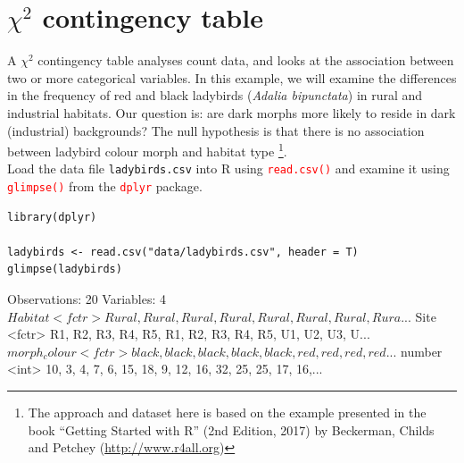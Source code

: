 \documentclass[a4paper,12pt]{article}
\newcommand\code[1]{\textcolor{red}{\texttt{#1}}}
\begin{document}


% 

\section{$\chi^{2}$ contingency table}

A $\chi ^{2}$ contingency table analyses count data, and looks at the association between two or more categorical variables. In this example, we will examine the differences in the frequency of red and black ladybirds (\textit{Adalia bipunctata}) in rural and industrial habitats. Our question is: are dark morphs more likely to reside in dark (industrial) backgrounds? The null hypothesis is that there is no association between ladybird colour morph and habitat type \footnote{The approach and dataset here is based on the example presented in the book ``Getting Started with R'' (2nd Edition, 2017) by Beckerman, Childs and Petchey (\url{http://www.r4all.org})}. \\

Load the data file \texttt{ladybirds.csv} into R using \code{read.csv()} and examine it using \code{glimpse()} from the \code{dplyr} package.\\

\begin{shaded}
\begin{verbatim}
library(dplyr)

ladybirds <- read.csv("data/ladybirds.csv", header = T)
glimpse(ladybirds)
\end{verbatim}
\end{shaded}

\begin{Schunk}
\begin{Soutput}
Observations: 20
Variables: 4
$ Habitat      <fctr> Rural, Rural, Rural, Rural, Rural, Rural, Rural, Rura...
$ Site         <fctr> R1, R2, R3, R4, R5, R1, R2, R3, R4, R5, U1, U2, U3, U...
$ morph_colour <fctr> black, black, black, black, black, red, red, red, red...
$ number       <int> 10, 3, 4, 7, 6, 15, 18, 9, 12, 16, 32, 25, 25, 17, 16,...
\end{Soutput}
\end{Schunk}
\end{document}
